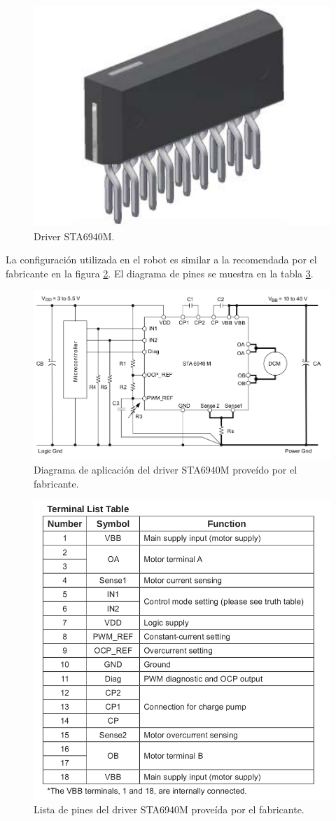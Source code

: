 \begin{figure}[H]
	\centering		\includegraphics[width=0.3\linewidth]{imagenes/prototipo/Driver}
	\caption{Driver STA6940M. }
	\label{imagen:Driver}
\end{figure}

La configuración utilizada en el robot es similar a la recomendada por el fabricante en la figura \ref{imagen:DriverAplicacion}. El diagrama de pines se muestra en la tabla \ref{imagen:DriverTabla}.

\begin{figure}[H]
	\centering		\includegraphics[width=0.7\linewidth]{imagenes/prototipo/InformacionDeAplicacion}
	\caption{Diagrama de aplicación del driver STA6940M proveído por el fabricante.}
	\label{imagen:DriverAplicacion}
\end{figure}


\begin{figure}[H]
	\centering		\includegraphics[width=0.7\linewidth]{imagenes/prototipo/TablaDePines}
	\caption{Lista de pines del driver STA6940M proveída por el fabricante. }
	\label{imagen:DriverTabla}
\end{figure}

